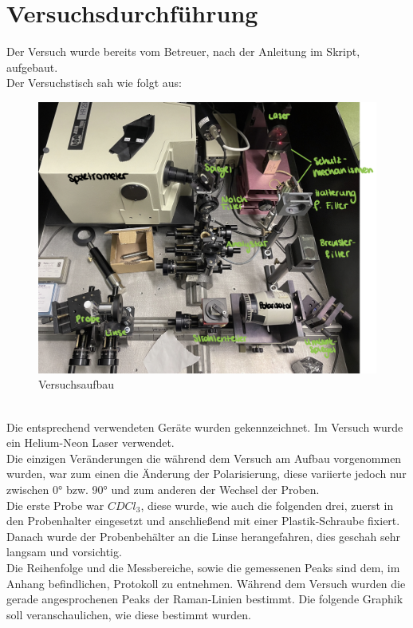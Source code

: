 \chapter{Versuchsdurchführung}
Der Versuch wurde bereits vom Betreuer, nach der Anleitung im Skript, aufgebaut.\\
Der Versuchstisch sah wie folgt aus: \\
\begin{figure}[h]
        \centering
        \includegraphics[scale=0.25]{Bilder/Aufbau.jpg}
        \caption{Versuchsaufbau}
\end{figure}\\
Die entsprechend verwendeten Geräte wurden gekennzeichnet. Im Versuch wurde ein 
Helium-Neon Laser verwendet. \\
Die einzigen Veränderungen die während dem Versuch am Aufbau vorgenommen wurden,
war zum einen die Änderung der 
Polarisierung, diese
variierte jedoch nur zwischen 0° bzw. 90° und zum anderen der Wechsel der Proben.\\
Die erste Probe war $CDCl_3$, diese wurde, wie auch die folgenden drei, zuerst in den
Probenhalter eingesetzt und anschließend mit einer Plastik-Schraube fixiert. 
Danach wurde der Probenbehälter an die Linse herangefahren, dies geschah sehr langsam
und vorsichtig.\\
Die Reihenfolge und die Messbereiche, sowie die gemessenen Peaks 
sind dem, im Anhang befindlichen, Protokoll 
zu entnehmen.
\newpage
Während dem Versuch wurden die gerade angesprochenen Peaks der Raman-Linien bestimmt. 
Die folgende Graphik soll veranschaulichen, wie diese bestimmt wurden.\\
